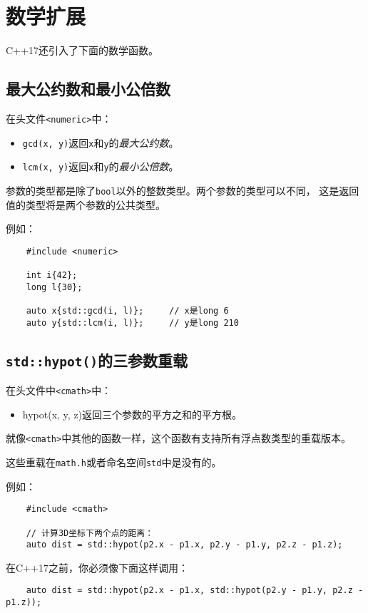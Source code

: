 \section{数学扩展}
C++17还引入了下面的数学函数。

\subsection{最大公约数和最小公倍数}
在头文件\texttt{<numeric>}中：
\begin{itemize}
    \item \texttt{gcd(x, y)}返回\texttt{x}和\texttt{y}的\emph{最大公约数}。
    \item \texttt{lcm(x, y)}返回\texttt{x}和\texttt{y}的\emph{最小公倍数}。
\end{itemize}
参数的类型都是除了\texttt{bool}以外的整数类型。两个参数的类型可以不同，
这是返回值的类型将是两个参数的公共类型。

例如：
\begin{lstlisting}
    #include <numeric>

    int i{42};
    long l{30};

    auto x{std::gcd(i, l)};     // x是long 6
    auto y{std::lcm(i, l)};     // y是long 210
\end{lstlisting}

\subsection{\texttt{std::hypot()}的三参数重载}
在头文件中\texttt{<cmath>}中：
\begin{itemize}
    \item hypot(x, y, z)返回三个参数的平方之和的平方根。
\end{itemize}
就像\texttt{<cmath>}中其他的函数一样，这个函数有支持所有浮点数类型的重载版本。

这些重载在\texttt{math.h}或者命名空间\texttt{std}中是没有的。

例如：
\begin{lstlisting}
    #include <cmath>

    // 计算3D坐标下两个点的距离：
    auto dist = std::hypot(p2.x - p1.x, p2.y - p1.y, p2.z - p1.z);
\end{lstlisting}
在C++17之前，你必须像下面这样调用：
\begin{lstlisting}
    auto dist = std::hypot(p2.x - p1.x, std::hypot(p2.y - p1.y, p2.z - p1.z));
\end{lstlisting}

